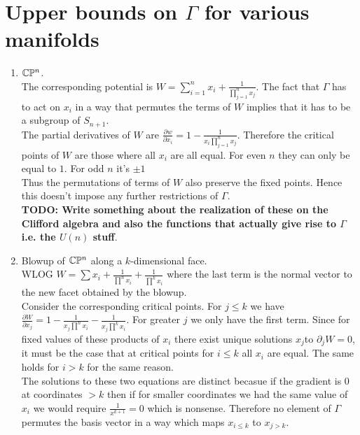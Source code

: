 \documentclass[a4paper]{article}
\begin{document}
\section{Upper bounds on $\Gamma$ for various manifolds}
\begin{enumerate}
<<<<<<< HEAD
    \item $\mathbb{C}\mathbb{P}^{n}$.\\ The corresponding potential is $W=\sum_{i=1}^{n} x_{i} + \frac{1}{\prod_{j=1}^{n} x_{j} }$. The fact that $\Gamma$ has to act on $x_{i}$ in a way that permutes the terms of $W$ implies that it has to be a subgroup of $S_{n+1}$.\\
        The partial derivatives of $W$ are $\frac{\partial w}{\partial x_{i}} =1-\frac{1}{x_{i}\prod_{j=1}^{n}x_{j}}$. Therefore the critical points of $W$ are those where all  $x_{i}$ are all equal. For even $n$ they can only be equal to $1$. For odd $n$ it's $\pm 1$\\
        Thus the permutations of terms of $W$ also preserve the fixed points. Hence this doesn't impose any further restrictions of $\Gamma$.\\
        \textbf{TODO: Write something about the realization of these on the Clifford algebra and also the functions that actually give rise to $\Gamma$ i.e. the $U(n)$ stuff}.\\
    \item Blowup of $\mathbb{C}\mathbb{P}^{n}$ along a $k$-dimensional face.\\
        WLOG $W=\sum x_{i}+\frac{1}{\prod ^n x_{i}}+\frac{1}{\prod ^k x_{i}}$ where the last term is the normal vector to the new facet obtained by the blowup.\\
        Consider the corresponding critical points. For $j\le k$ we have $\frac{\partial W}{\partial x_{j}} =1-\frac{1}{x_{j}\prod^n x_{i}} - \frac{1}{x_{j}\prod^k x_{i}}$. For greater $j$ we only have the first term.
        Since for fixed values of these products of $x_{i}$ there exist unique solutions $x_{j}$to $\partial_j W=0$, it must be the case that at critical points for $i\le k$ all $x_{i}$     are equal. The same holds for $i>k$ for the same reason. \\
        The solutions to these two equations are distinct becasue if the gradient is 0 at coordinates $>  k$ then if for smaller coordinates we had the same value of  $x_{i}$ we would require $\frac{1}{x^{k+1}}=0$ which is nonsense. Therefore  no element of $\Gamma $ permutes the basis vector in a way which maps $x_{i\le k}$ to $x_{j>k}$.\\

\end{enumerate}
\end{document}
